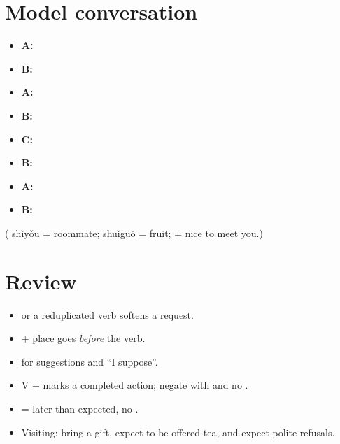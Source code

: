 \section{Model conversation}

\begin{itemize}
  \item \textbf{A:} 
  \item \textbf{B:} 
  \item \textbf{A:} 
  \item \textbf{B:} 
  \item \textbf{C:} 
  \item \textbf{B:} 
  \item \textbf{A:} 
  \item \textbf{B:} 
\end{itemize}
( shìyǒu = roommate;  shuǐguǒ = fruit;  = nice to
meet you.)

\section*{Review}
\begin{itemize}
  \item {} or a reduplicated verb softens a request.
  \item {} + place goes \emph{before} the verb.
  \item {} for suggestions and ``I suppose''.
  \item V +  marks a completed action; negate with  and no .
  \item {} = later than expected, no .
  \item Visiting: bring a gift, expect to be offered tea, and expect polite refusals.
\end{itemize}
